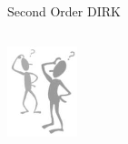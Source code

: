 \documentclass{beamer}
\begin{document}
\begin{frame}[allowframebreaks]{Second Order DIRK}
\newframe

\begin{block}

\end{block}

\end{frame}

\begin{frame}
  \begin{columns}
    \column{6cm}
    \begin{block}{}
      \centerline{ 
        \includegraphics[width=0.5\textwidth]{Question.png} 
      }
    \end{block}
  \end{columns}
\end{frame}
\end{document}
